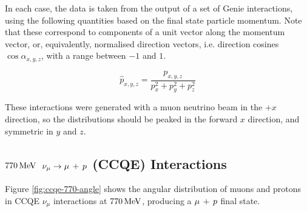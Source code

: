 In each case, the data is taken from the output of a set of Genie interactions, using the following quantities based on the final state particle momentum. Note that these correspond to components of a unit vector along the momentum vector, or, equivalently, normalised direction vectors, i.e. direction cosines $\cos\alpha_{x,y,z}$, with a range between $-1$ and $1$.

\begin{equation}\label{eqn:angular_variables}
    \hat{p}_{x,y,z} = \frac{p_{x,y,z}}{p_x^2 + p_y^2 + p_z^2}
\end{equation}

These interactions were generated with a muon neutrino beam in the $+x$ direction, so the distributions should be peaked in the forward $x$ direction, and symmetric in $y$ and $z$.

\subsection{$770\,\mathrm{MeV}$ $\nu_\mu \rightarrow \mu\,+\,p$ (CCQE) Interactions}
Figure \ref{fig:ccqe-770-angle} shows the angular distribution of muons and protons in \acs{CCQE} $\nu_\mu$ interactions at $770\,\mathrm{MeV}$, producing a $\mu\,+\,p$ final state.

